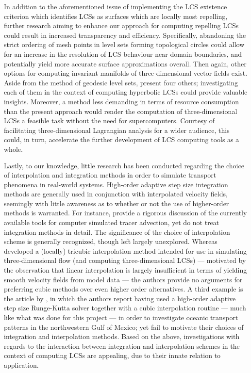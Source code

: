 In addition to the aforementioned issue of implementing the LCS existence
criterion which identifies LCSs as surfaces which are locally most repelling,
further research aiming to enhance our approach for computing repelling LCSs
could result in increased transparency and efficiency. Specifically,
abandoning the strict ordering of mesh points in level sets forming topological
circles could allow for an increase in the resolution of LCS behaviour near
domain boundaries, and potentially yield more accurate surface approximations
overall. Then again, other options for computing invariant manifolds of
three-dimensional vector fields exist. Aside from the method of geodesic level
sets, \textcite{krauskopf2005survey} present four others; investigating each of
them in the context of computing hyperbolic LCSs could provide valuable
insights. Moreover, a method less demanding in terms of resource
consumption than the present approach would render the computation of
three-dimensional LCSs a feasible task without the need for supercomputers.
Courtesy of facilitating three-dimensional Lagrangian analysis for a wider
audience, this could, in turn, accelerate the further development of LCS
computing tools as a whole.

Lastly, to our knowledge, little research has been conducted regarding the
choice of interpolation and integration methods in order to simulate transport
phenomena in real-world systems. High-order adaptive step size integration
methods are generally used in conjunction with interpolated velocity fields,
seemingly with little awareness as to whether or not the use of higher-order
methods is warranted. For instance, \textcite{vansebille2018lagrangian}
provide a rigorous discussion of the currently available tools for computer
simulated tracer advection, yet do not treat integration methods in detail.
The significance of the choice of interpolation scheme is generally recognized,
though left largely unexplored. Whereas \textcite{lekien2005tricubic} developed
a (locally) tricubic interpolation method intended for use in simulating
three-dimensional flow (and computing three-dimensional LCSs) --- motivated by
the observation that linear interpolation is largely insufficient in terms of
yielding smooth velocity fields from model data --- the authors provide no
arguments for preferring cubic methods over even higher order alternatives. A
third example is the article by \textcite{gough2017persistent}, in which the
authors report having used a high-order adaptive step size Runge-Kutta solver
together with a cubic interpolation routine --- much like what was done for
this project --- in order to investigate oceanic transport patterns in the
northwestern Gulf of Mexico; yet fail to motivate their choices of integration
and interpolation methods. Based on the above, investigations with regards to
the interaction between integration and interpolation schemes in the context
of computing LCSs are appealing, due to their innate relation to application.
